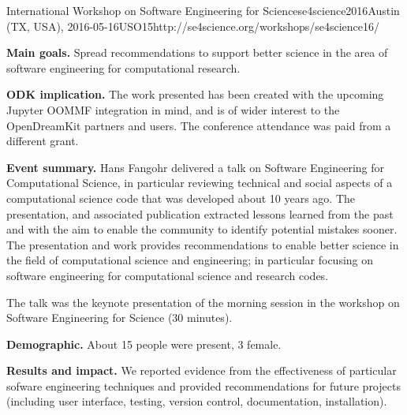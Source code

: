 \begin{event}{International Workshop on Software Engineering for
    Science}{se4science2016}{Austin (TX, USA),
    2016-05-16}{USO}{15}{http://se4science.org/workshops/se4science16/}

  \textbf{Main goals.} Spread recommendations to support better
  science in the area of software engineering for computational research.

  \textbf{ODK implication.} The work presented has been created with
  the upcoming Jupyter OOMMF integration in mind, and is of wider
  interest to the OpenDreamKit partners and users. The conference
  attendance was paid from a different grant.

  \textbf{Event summary.} Hans Fangohr delivered a talk on Software
  Engineering for Computational Science, in particular reviewing
  technical and social aspects of a computational science code that
  was developed about 10 years ago. The presentation, and associated
  publication \cite{16FangohrSE4Science} extracted lessons learned from the past and with the aim
  to enable the community to identify potential mistakes sooner. The
  presentation and work provides recommendations to enable better
  science in the field of computational science and engineering; in
  particular focusing on software engineering for computational
  science and research codes.

  The talk was the keynote presentation of the morning session in the
  workshop on Software Engineering for Science (30 minutes).

  \textbf{Demographic.} About 15 people were present, 3 female.

  \textbf{Results and impact.} We reported evidence from the
  effectiveness of particular sofware engineering techniques and
  provided recommendations for future projects (including user
  interface, testing, version control, documentation,
  installation).


\end{event}
